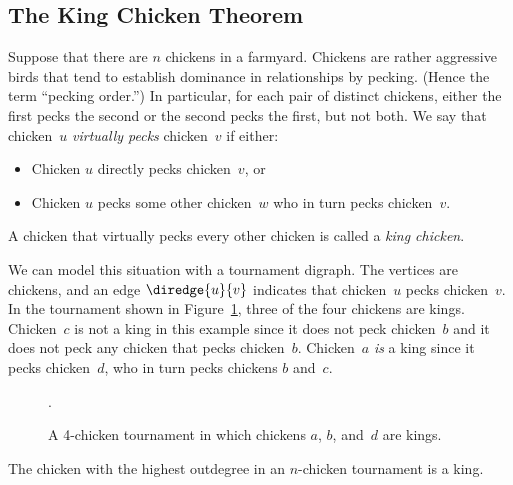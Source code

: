 \subsection{The King Chicken Theorem}

Suppose that there are $n$ chickens in a farmyard.  Chickens are
rather aggressive birds that tend to establish dominance in
relationships by pecking.  (Hence the term ``pecking order.'')  In
particular, for each pair of distinct chickens, either the first pecks
the second or the second pecks the first, but not both.  We say that
chicken~$u$ \emph{virtually pecks} chicken~$v$ if either:
\begin{itemize}

\item Chicken $u$ directly pecks chicken~$v$, or

\item Chicken $u$ pecks some other chicken~$w$ who in turn pecks
  chicken~$v$.

\end{itemize}
A chicken that virtually pecks every other chicken is called a
\emph{king chicken}.

We can model this situation with a tournament digraph.  The vertices
are chickens, and an edge $\diredge{u}{v}$ indicates that chicken~$u$ pecks
chicken~$v$.  In the tournament shown in Figure~\ref{fig:6EE3}, three
of the four chickens are kings.  Chicken~$c$ is not a king in this
example since it does not peck chicken~$b$ and it does not peck any
chicken that pecks chicken~$b$.  Chicken~$a$ \emph{is} a king since it
pecks chicken~$d$, who in turn pecks chickens $b$ and~$c$.

\begin{figure}

\missinggraphic

\caption{A 4-chicken tournament in which chickens $a$, $b$, and~$d$
  are kings.}

\label{fig:6EE3}.

\end{figure}

\begin{theorem}\label{thm:king_chicken}
The  chicken with the highest  outdegree
in an $n$-chicken tournament is a king.
\end{theorem}

